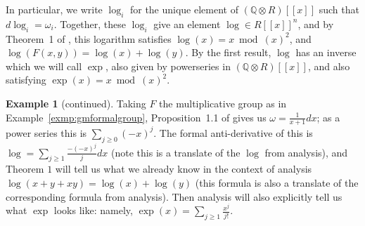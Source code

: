 \documentclass[12pt]{article}
\newcommand{\Q}{\mathbb{Q}}
\newcommand{\tensor}{\otimes}
\theoremstyle{plain}
\theoremstyle{definition}
\newtheorem{exmp}[thm]{Example} %
\theoremstyle{remark}
\begin{document}
In particular, we write $\log_i$ for the unique element of $(\Q\tensor R)[[x]]$ such that $d\log_i = \omega_i$. Together, these $\log_i$ give an element $\log \in R[[x]]^n$, and by Theorem~1 of \cite{honda70}, this logarithm satisfies $\log(x) = x \bmod (x)^2$, and $\log(F(x,y)) = \log(x)+\log(y)$. By the first result, $\log$ has an inverse which we will call $\exp$, also given by powerseries in $(\Q\tensor R)[[x]]$, and also satisfying $\exp(x) = x \bmod (x)^2$.
\addtocounter{thm}{-1}
\begin{exmp}[continued]
Taking $F$ the multiplicative group as in Example~\ref{exmp:gmformalgroup}, Proposition~1.1 of \cite{honda70} gives us $\omega = \frac{1}{x+1}dx$; as a power series this is $\sum_{j \geq 0} (-x)^j$. The formal anti-derivative of this is $\log = \sum_{j \geq 1} \frac{-(-x)^j}{j}dx$ (note this is a translate of the $\log$ from analysis), and Theorem $1$ will tell us what we already know in the context of analysis $\log(x + y + xy) = \log(x)+\log(y)$ (this formula is also a translate of the corresponding formula from analysis). Then analysis will also explicitly tell us what $\exp$ looks like: namely, $\exp(x) = \sum_{j \geq 1} \frac{x^j}{j!}$.
\end{exmp}
\addtocounter{thm}{2}
\end{document}
